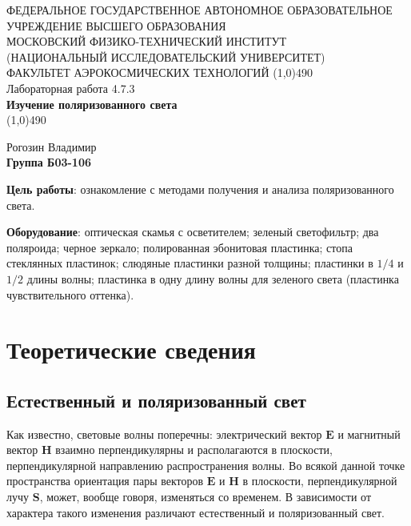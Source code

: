 \documentclass[a4paper,12pt]{article}
\begin{document}
\begin{titlepage}
\begin{center}
\large{\small ФЕДЕРАЛЬНОЕ ГОСУДАРСТВЕННОЕ АВТОНОМНОЕ ОБРАЗОВАТЕЛЬНОЕ\\ УЧРЕЖДЕНИЕ ВЫСШЕГО ОБРАЗОВАНИЯ \\ МОСКОВСКИЙ ФИЗИКО-ТЕХНИЧЕСКИЙ ИНСТИТУТ\\ (НАЦИОНАЛЬНЫЙ ИССЛЕДОВАТЕЛЬСКИЙ УНИВЕРСИТЕТ)\\ ФАКУЛЬТЕТ АЭРОКОСМИЧЕСКИХ ТЕХНОЛОГИЙ}
\vfill
\line(1,0){490}\\[1mm]
\huge{Лабораторная работа 4.7.3}\\
\huge\textbf{Изучение поляризованного света}\\
\line(1,0){490}\\[1mm]
\vfill
\begin{flushright}
\normalsize{Рогозин Владимир}\\
\normalsize{\textbf{Группа Б03-106}}\\
\end{flushright}
\end{center}
\end{titlepage}

\textbf{Цель работы}:
ознакомление с методами получения и анализа поляризованного света.

\textbf{Оборудование}:
оптическая скамья с осветителем; зеленый светофильтр; два поляроида; черное зеркало; полированная эбонитовая пластинка; стопа стеклянных пластинок; слюдяные пластинки разной толщины; пластинки в $1/4$ и $1/2$ длины волны; пластинка в одну длину волны для зеленого света (пластинка чувствительного оттенка).

\section{Теоретические сведения}

\subsection{Естественный и поляризованный свет}
Как известно, световые волны поперечны: электрический вектор $\mathbf{E}$ и магнитный вектор $\mathbf{H}$ взаимно перпендикулярны и располагаются в плоскости, перпендикулярной направлению распространения волны. Во всякой данной точке пространства ориентация пары векторов $\mathbf{E}$ и $\mathbf{H}$ в плоскости, перпендикулярной лучу $\mathbf{S}$, может, вообще говоря, изменяться со временем.
В зависимости от характера такого изменения различают естественный и поляризованный свет.
\end{document}
